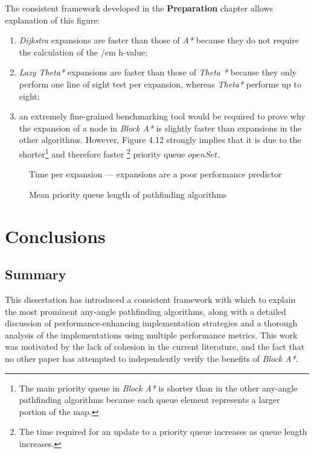 \documentclass[12pt,notitlepage]{report}
\begin{document}
\noindent
The consistent framework developed in the {\bfseries Preparation} chapter allows explanation of this figure:
\begin{enumerate}
\item {\em Dijkstra} expansions are faster than those of {\em A*} because they do not require the calculation of the {/em h-value};
\item {\em Lazy Theta*} expansions are faster than those of {\em Theta *} because they only perform one line of sight test per expansion, whereas {\em Theta*} performs up to eight;
\item an extremely fine-grained benchmarking tool would be required to prove why the expansion of a node in {\em Block A*} is slightly faster than expansions in the other algorithms. However, Figure 4.12 strongly implies that it is due to the shorter\footnote{The main priority queue in {\em Block A*} is shorter than in the other any-angle pathfinding algorithms because each queue element represents a larger portion of the map.} and therefore faster \footnote{The time required for an update to a priority queue increases as queue length increases.\cite{CormenDijkstra}} priority queue $openSet$.
\end{enumerate}

\begin{figure}
\centering

\caption[Time per expansion of pathfinding algorithms]{Time per expansion --- expansions are a poor performance predictor}

\caption[Mean priority queue length of pathfinding algorithms]{Mean priority queue length of pathfinding algorithms}
\end{figure}

\chapter{Conclusions}

\section{Summary}
This dissertation has introduced a consistent framework with which to explain the most prominent any-angle pathfinding algorithms, along with a detailed discussion of performance-enhancing implementation strategies and a thorough analysis of the implementations using multiple performance metrics. This work was motivated by the lack of cohesion in the current literature, and the fact that no other paper has attempted to independently verify the benefits of {\em Block A*}.\\
\end{document}
